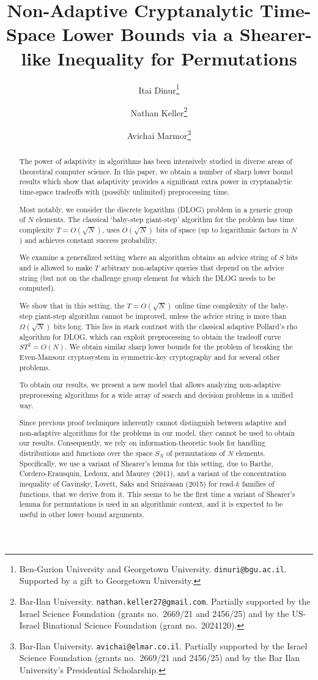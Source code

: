\documentclass[11pt]{article}
\title{Non-Adaptive Cryptanalytic Time-Space Lower Bounds via a Shearer-like Inequality for Permutations}
\author{Itai Dinur\thanks{Ben-Gurion University and Georgetown University. \texttt{dinuri@bgu.ac.il}. Supported by a gift to Georgetown University.}
\and Nathan Keller\thanks{Bar-Ilan University. \texttt{nathan.keller27@gmail.com}. Partially supported by the Israel Science Foundation (grants no.\ 2669/21 and 2456/25) and by the US-Israel Binational Science Foundation (grant no.\ 2024120).}
\and Avichai Marmor\thanks{Bar-Ilan University. \texttt{avichai@elmar.co.il}. Partially supported by the Israel Science Foundation (grants no.\ 2669/21 and 2456/25) and by the Bar Ilan University's Presidential Scholarship.}}
\date{}
\begin{document}
\maketitle

\begin{abstract}
    The power of adaptivity in algorithms has been intensively studied in diverse areas of theoretical computer science. In this paper, we obtain a number of sharp lower bound results which show that adaptivity provides a significant extra power in cryptanalytic time-space tradeoffs with (possibly unlimited) preprocessing time.  

    Most notably, we consider the discrete logarithm (DLOG) problem in a generic group of $N$ elements. The classical `baby-step giant-step' algorithm for the problem has time complexity $T=O(\sqrt{N})$, uses $O(\sqrt{N})$ bits of space (up to logarithmic factors in $N$) and achieves constant success probability.

    We examine a generalized setting where an algorithm obtains an advice string of  $S$ bits and is allowed to make $T$ arbitrary non-adaptive queries that depend on the advice string (but not on the challenge group element for which the DLOG needs to be computed). 
    
    We show that in this setting, the $T=O(\sqrt{N})$ online time complexity of the baby-step giant-step algorithm cannot be improved, unless the advice string is more than $\Omega(\sqrt{N})$ bits long. This lies in stark contrast with the classical adaptive Pollard's rho algorithm for DLOG, which can exploit preprocessing to obtain the tradeoff curve $ST^2=O(N)$. We obtain similar sharp lower bounds for the problem of breaking the Even-Mansour cryptosystem in symmetric-key cryptography and for several other problems. 
    
    To obtain our results, we present a new model that allows analyzing non-adaptive preprocessing algorithms for a wide array of search and decision problems in a unified way. 
    
    Since previous proof techniques inherently cannot distinguish between adaptive and non-adaptive algorithms for the problems in our model, they cannot be used to obtain our results. Consequently, we rely on information-theoretic tools for handling distributions and functions over the space $S_N$ of permutations of $N$ elements. Specifically, we use a variant of Shearer's lemma for this setting, due to Barthe, Cordero-Erausquin, Ledoux, and Maurey (2011), and a variant of the concentration inequality of Gavinsky, Lovett, Saks and Srinivasan (2015) for read-$k$ families of functions, that we derive from it. This seems to be the first time a variant of Shearer's lemma for permutations is used in an algorithmic context, and it is expected to be useful in other lower bound arguments.
\end{abstract}
\end{document}

